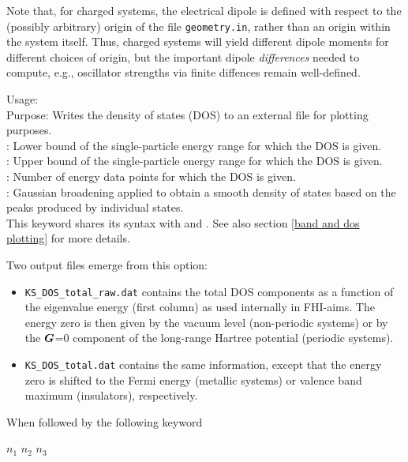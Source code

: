 Note that, for charged systems, the electrical dipole is defined with
respect to the (possibly arbitrary) origin of the file
\texttt{geometry.in}, rather than an origin within the system
itself. Thus, charged systems will yield different dipole moments
for different choices of origin, but the important dipole
\emph{differences} needed to compute, e.g., oscillator strengths via
finite diffences remain well-defined.

{
  Usage:    \\[1.0ex]
  Purpose: Writes the density of states (DOS) to an external file for
    plotting purposes.\\[1.0ex]
   : Lower bound of the single-particle energy range
    for which the DOS is given. \\
   : Upper bound of the single-particle energy range
    for which the DOS is given. \\
   : Number of energy data points for which the
    DOS is given. \\
   : Gaussian broadening applied to obtain a smooth
    density of states based on the peaks produced by
    individual states. \\
} 
This keyword shares its syntax with 
 and 
. See also section \ref{band
  and dos plotting} for more details.   

Two output files emerge from this option:
\begin{itemize}
  \item \texttt{KS\_DOS\_total\_raw.dat} contains the total DOS components as
    a function of the eigenvalue energy (first column) as used internally in 
    FHI-aims. The energy zero is then given by the vacuum level (non-periodic
    systems) or by the $\mbox{\boldmath$G$}$=0 component of the long-range Hartree
    potential (periodic systems).
  \item \texttt{KS\_DOS\_total.dat} contains the same
    information, except that the energy zero is shifted to the Fermi energy
    (metallic systems) or valence band maximum (insulators), respectively.
\end{itemize}

When followed by the following keyword

  $n_1$  $n_2$  $n_3$

